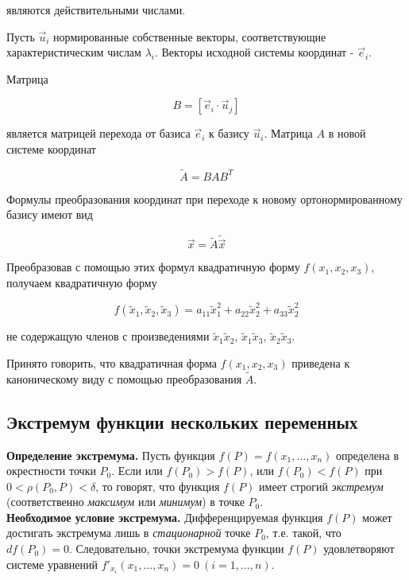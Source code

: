         являются действительными числами.

        Пусть $\vec{u}_{i}$ нормированные собственные векторы, соответствующие характеристическим числам $\lambda_{i}$. Векторы исходной системы координат - $\vec{e}_{i}$.
        
        Матрица

        \[
            B = \left[ \vec{e}_{i} \cdot \vec{u}_{j} \right]
        \]

        является матрицей перехода от базиса $\vec{e}_{i}$ к базису $\vec{u}_{i}$. Матрица $A$ в новой системе координат
        
        \[
            \tilde{A} = B A B^{T}
        \]

        Формулы преобразования координат при переходе к новому ортонормированному базису имеют вид

        \[
            \vec{x} = \tilde{A} \tilde{\vec{x}}
        \]

        Преобразовав с помощью этих формул квадратичную форму $f \left( x_{1}, x_{2}, x_{3} \right)$, получаем квадратичную форму

        \[
            f \left( \tilde{x}_{1}, \tilde{x}_{2}, \tilde{x}_{3} \right) = a_{11} \tilde{x}^{2}_{1} + a_{22} \tilde{x}^{2}_{2} + a_{33} \tilde{x}^{2}_{2}
        \]

        не содержащую членов с произведениями $\tilde{x}_{1} \tilde{x}_{2}$, $\tilde{x}_{1} \tilde{x}_{3}$, $\tilde{x}_{2} \tilde{x}_{3}$.

        Принято говорить, что квадратичная форма $f \left( x_{1}, x_{2}, x_{3} \right)$ приведена к каноническому виду с помощью преобразования $\tilde{A}$.

    \subsection{Экстремум функции нескольких переменных}

        \textbf{Определение экстремума.} Пусть функция $f \left( P \right) = f \left( x_{1}, \ldots, x_{n} \right)$ определена в окрестности точки $P_{0}$. Если или $f \left( P_{0} \right) > f \left( P \right)$, или $f \left( P_{0} \right) < f \left( P \right)$ при $0 < \rho \left( P_{0}, P \right) < \delta$, то говорят, что функция $f \left( P \right)$ имеет строгий \textit{экстремум} (соответственно \textit{максимум} или \textit{минимум}) в точке $P_{0}$.\\

        \textbf{Необходимое условие экстремума.} Дифференцируемая функция $f \left( P \right)$ может достигать экстремума лишь в \textit{стационарной} точке $P_{0}$, т.е. такой, что $d f \left( P_{0} \right) = 0$. Следовательно, точки экстремума функции $f \left( P \right)$ удовлетворяют системе уравнений $f'_{x_{i}} \left( x_{1}, \ldots, x_{n} \right) = 0 \: (i = 1, \ldots, n)$.\\

